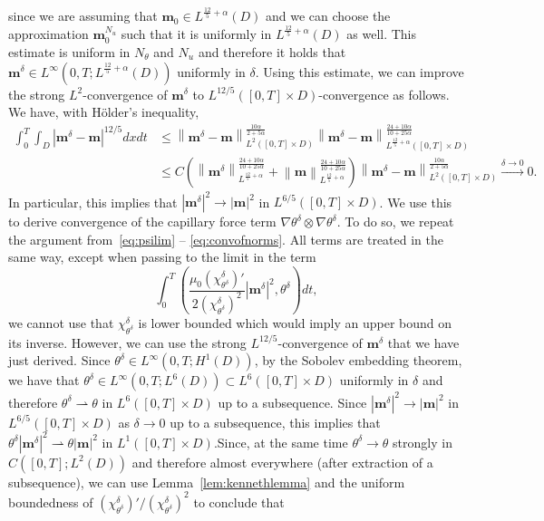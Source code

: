 \documentclass[10pt,letterpaper,twoside]{amsart}
\theoremstyle{definition}{\newtheorem{definition}[lemma]{Definition}}
\theoremstyle{note}{\newtheorem{claim}{Claim}[section]
\newtheorem*{claim*}{Claim}}
\numberwithin{equation}{section}
\newcommand{\dom}{D}
\newcommand{\norm}[1]{\left\| #1 \right\|}
\newcommand{\Grad}{\nabla}
\newcommand{\weak}{\rightharpoonup}
\newcommand{\bm}{\mathbf{m}}
\newcommand{\bmd}{\mathbf{m}^\delta}
\newcommand{\td}{\theta^\delta}
\begin{document}
 since we are assuming that $\bm_0\in L^{\frac{12}{5}+\alpha}(\dom)$ and we can choose the approximation $\bm_0^{N_u}$ such that it is uniformly in $L^{\frac{12}{5}+\alpha}(\dom)$ as well. This estimate is uniform in $N_\theta$ and $N_u$ and therefore it holds that $\bmd\in L^\infty(0,T;L^{\frac{12}{5}+\alpha}(\dom))$ uniformly in $\delta$. Using this estimate, we can improve the strong $L^2$-convergence of $\bmd$ to $L^{12/5}([0,T]\times\dom)$-convergence as follows. We have, with H\"older's inequality,
 \begin{align*}
 	\int_0^T\int_{\dom} |\bmd-\bm|^{12/5} dx dt& \leq \norm{\bmd-\bm}_{L^2([0,T]\times\dom)}^{\frac{10\alpha}{2+5\alpha}}\norm{\bmd-\bm}_{L^{\frac{12}{5}+\alpha}([0,T]\times\dom)}^{\frac{24+10\alpha}{10+25\alpha}}\\
 	&\leq C\left(\norm{\bmd}_{L^{\frac{12}{5}+\alpha}}^{\frac{24+10\alpha}{10+25\alpha}}+\norm{\bm}_{L^{\frac{12}{5}+\alpha}}^{\frac{24+10\alpha}{10+25\alpha}}\right)\norm{\bmd-\bm}_{L^2([0,T]\times\dom)}^{\frac{10\alpha}{2+5\alpha}}\stackrel{\delta\to 0}{\longrightarrow} 0. 	
 \end{align*}
 In particular, this implies that $|\bmd|^2\to |\bm|^2$ in $L^{6/5}([0,T]\times\dom)$. We use this to derive convergence of the capillary force term $\Grad\td\otimes\Grad\td$. To do so, we repeat the argument from~\eqref{eq:psilim} --  \eqref{eq:convofnorms}. All terms are treated in the same way, except when passing to the limit in the term
 \begin{equation*}
 	\int_0^T \left(\frac{\mu_0(\chi_{\td}^\delta)'}{2(\chi_{\td}^\delta)^2}|\bmd|^2,\td\right) dt,
 \end{equation*}
 we cannot use that $\chi_{\td}^\delta$ is lower bounded which would imply an upper bound on its inverse. However, we can use the strong $L^{12/5}$-convergence of $\bmd$ that we have just derived. Since $\td\in L^\infty(0,T;H^1(\dom))$, by the Sobolev embedding theorem, we have that $\td\in L^\infty(0,T;L^6(\dom))\subset L^6([0,T]\times\dom)$ uniformly in $\delta$ and therefore $\td\weak \theta$ in $L^6([0,T]\times \dom)$ up to a subsequence. Since $|\bmd|^2\rightarrow |\bm|^2$ in $L^{6/5}([0,T]\times\dom)$ as $\delta\to 0$ up to a subsequence, this implies that $\td|\bmd|^2\weak \theta|\bm|^2$ in $L^1([0,T]\times\dom)$.Since,  at the same time  $\td\to \theta$ strongly in $C([0,T];L^2(\dom))$ and therefore almost everywhere (after extraction of a subsequence), we can use Lemma~\ref{lem:kennethlemma} and the uniform boundedness of $(\chi^\delta_{\td})'/(\chi_{\td}^\delta)^2$ to conclude that
\end{document}
